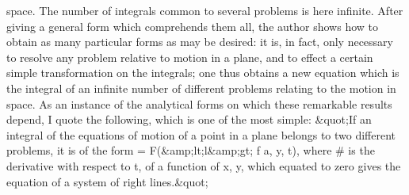 \documentclass[11pt,a4paper]{book}
\begin{document}
space.
The
number
of
integrals common
to
several
problems
is
here
infinite.
After
giving
a
general
form
which comprehends
them
all,
the
author
shows how
to
obtain
as many
particular
forms
as may
be
desired:
it
is,
in
fact,
only
necessary
to
resolve
any problem
relative
to motion
in a
plane, and
to
effect a
certain simple transformation
on
the
integrals;
one
thus
obtains
a
new
equation
which
is
the
integral
of
an
infinite number of different problems
relating
to the motion
in
space.
As
an
instance
of
the
analytical
forms
on
which
these
remarkable
results depend,
I
quote
the
following,
which
is
one
of
the
most
simple:
\&quot;If
an
integral
of
the
equations
of
motion
of
a
point
in
a
plane
belongs
to
two
different
problems,
it
is
of
the
form
=
F(\&amp;lt;l\&amp;gt;
f
a,
y,
t),
where \#
is
the
derivative
with
respect
to
t,
of a
function
of
x,
y, which
equated
to
zero gives the equation of a system
of right
lines.\&quot;

\end{document}
